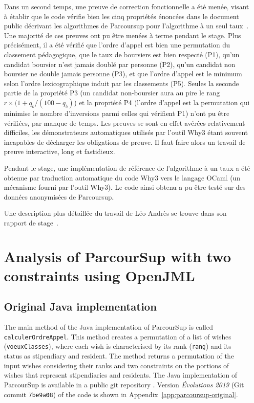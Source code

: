 \documentclass[a4paper]{report}
\newcommand{\aref}[1]{Appendix~\ref{#1}}
\begin{document}
Dans un second temps, une preuve de correction fonctionnelle a été menée, visant
à établir que le code vérifie bien les cinq propriétés énoncées dans le document
public décrivant les algorithmes de Parcoursup pour l'algorithme à un seul
taux~\cite[page 7, propriétés 1--5]{parcoursup-specifications}.  Une majorité de
ces preuves ont pu être menées à terme pendant le stage. Plus précisément, il a
été vérifié que l'ordre d'appel est bien une permutation du classement
pédagogique, que le taux de boursiers est bien respecté (P1), qu'un candidat
boursier n'est jamais doublé par personne (P2), qu'un candidat non boursier ne
double jamais personne (P3), et que l’ordre d’appel est le minimum selon l’ordre
lexicographique induit par les classements (P5).  Seules la seconde partie de la
propriété P3 (un candidat non-boursier aura au pire le rang
$r\times(1+q_b/(100-q_b)$) et la propriété P4 (l'ordre d'appel est la
permutation qui minimise le nombre d'inversions parmi celles qui vérifient P1)
n'ont pu être vérifiées, par manque de temps.  Les preuves se sont en effet
avérées relativement difficiles, les démonstrateurs automatiques utilisés par
l'outil Why3 étant souvent incapables de décharger les obligations de preuve. Il
faut faire alors un travail de preuve interactive, long et fastidieux.

Pendant le stage, une implémentation de référence de l'algorithme à un taux a
été obtenue par traduction automatique du code Why3 vers le langage OCaml (un
mécanisme fourni par l'outil Why3). Le code ainsi obtenu a pu être testé sur des
données anonymisées de Parcoursup.

Une description plus détaillée du travail de Léo Andrès se
trouve dans son rapport de stage~\cite{andres19rr}.


\section{Analysis of ParcourSup with two constraints using OpenJML}
\label{sec:openjml}

\subsection{Original Java implementation}
\label{sec:parcoursup-original}

The main method of the Java implementation of ParcourSup is called
\texttt{calculerOrdreAppel}. This method creates a permutation of a list of
wishes (\texttt{voeuxClasses}), where each wish is characterised by its rank
(\texttt{rang}) and its status as stipendiary and resident. The method returns a
permutation of the input wishes considering their ranks and two constraints on
the portions of wishes that represent stipendiaries and residents. The Java
implementation of ParcourSup is available in a public git repository
\cite{parcoursup-source}. Version \emph{\'Evolutions 2019} (Git commit
\texttt{7be9a08}) of the code is shown in \aref{app:parcoursup-original}.
\end{document}
